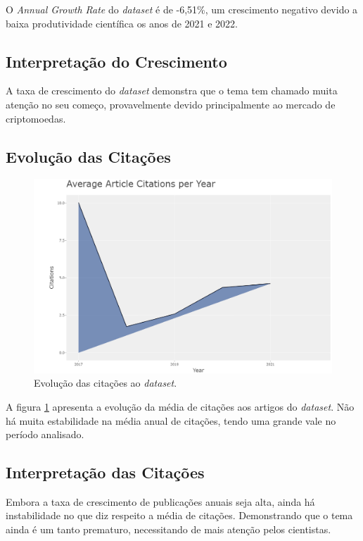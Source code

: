 O \textit{Annual Growth Rate} do \textit{dataset} é de -6,51\%, um crescimento negativo devido a baixa produtividade científica os anos de 2021 e 2022.

\subsection{Interpretação do Crescimento} 
A taxa de crescimento do \textit{dataset} demonstra que o tema tem chamado muita atenção no seu começo, provavelmente devido principalmente ao mercado de criptomoedas.

\subsection{Evolução das Citações}

\begin{figure}
    \centering
    \includegraphics[angle=0,width=1\textwidth]{experiments/FernandoCordeiro/AnaliseBibliometrica/Blockchain/citations_year_plot.png}
    \caption{Evolução das citações ao \textit{dataset}.}
    \label{fig:evol:anual:citacoes:BLOCKCHAIN@FernandoCordeiro}
\end{figure}

A figura \ref{fig:evol:anual:citacoes:BLOCKCHAIN@FernandoCordeiro} apresenta a evolução da média de citações aos artigos do \textit{dataset}. Não há muita estabilidade na média anual de citações, tendo uma grande vale no período analisado.

\subsection{Interpretação das Citações}
Embora a taxa de crescimento de publicações anuais seja alta, ainda há instabilidade no que diz respeito a média de citações. Demonstrando que o tema ainda é um tanto prematuro, necessitando de mais atenção pelos cientistas.

